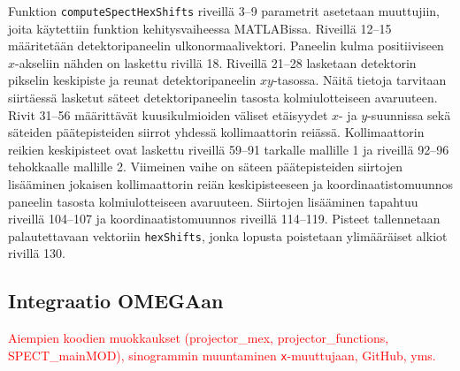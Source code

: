 Funktion \texttt{computeSpectHexShifts} riveillä 3--9 parametrit asetetaan muuttujiin, joita käytettiin funktion kehitysvaiheessa MATLABissa. Riveillä 12--15 määritetään detektoripaneelin ulkonormaalivektori. Paneelin kulma positiiviseen $x$-akseliin nähden on laskettu rivillä 18. Riveillä 21--28 lasketaan detektorin pikselin keskipiste ja reunat detektoripaneelin $xy$-tasossa. Näitä tietoja tarvitaan siirtäessä lasketut säteet detektoripaneelin tasosta kolmiulotteiseen avaruuteen. Rivit 31--56 määrittävät kuusikulmioiden väliset etäisyydet $x$- ja $y$-suunnissa sekä säteiden päätepisteiden siirrot yhdessä kollimaattorin reiässä. Kollimaattorin reikien keskipisteet ovat laskettu riveillä 59--91 tarkalle mallille 1 ja riveillä 92--96 tehokkaalle mallille 2. Viimeinen vaihe on säteen päätepisteiden siirtojen lisääminen jokaisen kollimaattorin reiän keskipisteeseen ja koordinaatistomuunnos paneelin tasosta kolmiulotteiseen avaruuteen. Siirtojen lisääminen tapahtuu riveillä 104--107 ja koordinaatistomuunnos riveillä 114--119. Pisteet tallennetaan palautettavaan vektoriin \texttt{hexShifts}, jonka lopusta poistetaan ylimääräiset alkiot rivillä 130.

\subsection{Integraatio OMEGAan}
\textcolor{red}{Aiempien koodien muokkaukset (projector\_mex, projector\_functions, SPECT\_mainMOD), sinogrammin muuntaminen \texttt{x}-muuttujaan, GitHub, yms.}